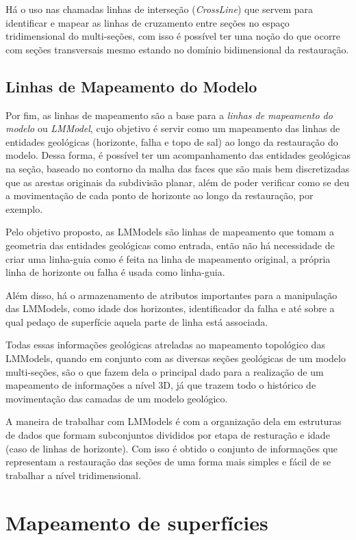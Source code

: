 Há o uso nas chamadas linhas de interseção (\textit{CrossLine}) que servem para identificar e mapear as linhas de cruzamento entre seções no espaço tridimensional do multi-seções, com isso é possível ter uma noção do que ocorre com seções transversais mesmo estando no domínio bidimensional da restauração.

\subsection{Linhas de Mapeamento do Modelo}

Por fim, as linhas de mapeamento são a base para a \textit{linhas de mapeamento do modelo} ou \textit{LMModel}, cujo objetivo é servir como um mapeamento das linhas de entidades geológicas (horizonte, falha e topo de sal) ao longo da restauração do modelo. Dessa forma, é possível ter um acompanhamento das entidades geológicas na seção, baseado no contorno da malha das faces que são mais bem discretizadas que as arestas originais da subdivisão planar, além de poder verificar como se deu a movimentação de cada ponto de horizonte ao longo da restauração, por exemplo.

Pelo objetivo proposto, as LMModels são linhas de mapeamento que tomam a geometria das entidades geológicas como entrada, então não há necessidade de criar uma linha-guia como é feita na linha de mapeamento original, a própria linha de horizonte ou falha é usada como linha-guia.

Além disso, há o armazenamento de atributos importantes para a manipulação das LMModels, como idade dos horizontes, identificador da falha e até sobre a qual pedaço de superfície aquela parte de linha está associada.

Todas essas informações  geológicas atreladas ao mapeamento topológico das LMModels, quando em conjunto com as diversas seções geológicas de um modelo multi-seções, são o que fazem dela o principal dado para a realização de um mapeamento de informações a nível 3D, já que trazem todo o histórico de movimentação das camadas de um modelo geológico.

A maneira de trabalhar com LMModels é com a organização dela em estruturas de dados que formam subconjuntos divididos por etapa de resturação e idade (caso de linhas de horizonte). Com isso é obtido o conjunto de informações que representam a restauração das seções de uma forma mais simples e fácil de se trabalhar a nível tridimensional.

\section{Mapeamento de superfícies}

